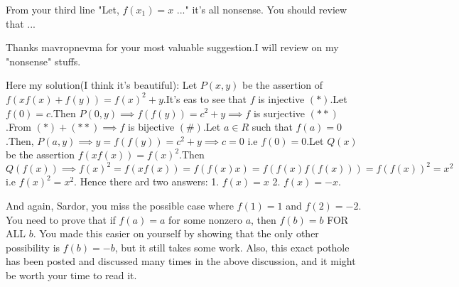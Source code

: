 \begin{solution}
	\begin{tcolorbox}
From your third line "Let, $f(x_1)=x$ ..." it's all nonsense. You should review that ...\end{tcolorbox}
Thanks mavropnevma for your most valuable suggestion.I will review on my "nonsense" stuffs.
\end{solution}



\begin{solution}
	Here my solution(I think it's beautiful):
Let $ P(x,y) $ be the assertion of $ f(xf(x)+f(y))=f(x)^2+y $.It's eas to see that $ f $ is injective $ (*) $.Let $ f(0)=c $.Then $ P(0,y) \implies f(f(y))=c^2+y  \implies f $ is surjective $ (**) $.From $ (*)+(**) \implies f $ is bijective $ (\#) $.Let $ a\in R $ such that $ f(a)=0 $.Then, $ P(a,y) \implies y=f(f(y))=c^2+y \implies c=0 $ i.e $ f(0)=0 $.Let $ Q(x) $ be the assertion $ f(xf(x))=f(x)^2 $.Then
$ Q(f(x)) \implies f(x)^2=f(xf(x))=f(f(x)x)=f(f(x)f(f(x)))=f(f(x))^2=x^2 $ i.e $ f(x)^2=x^2 $. Hence there ard two answers:
1. $ f(x)=x $
2. $ f(x)=-x $.
\end{solution}



\begin{solution}
	And again, Sardor, you miss the possible case where $f(1)=1$ and $f(2)=-2$.  You need to prove that if $f(a)=a$ for some nonzero $a$, then $f(b)=b$ FOR ALL $b$.  You made this easier on yourself by showing that the only other possibility is $f(b)=-b$, but it still takes some work.  Also, this exact pothole has been posted and discussed many times in the above discussion, and it might be worth your time to read it.
\end{solution}



